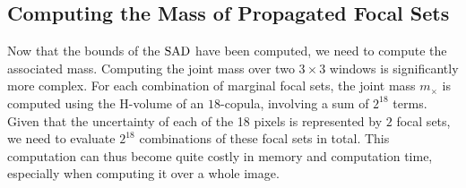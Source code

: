\begin{remark}
{}
\end{remark}

\subsection{Computing the Mass of Propagated Focal Sets}\label{sec:propagated_masses}
Now that the bounds of the $\mathrm{SAD}$ have been computed, we need to compute the associated mass. Computing the joint mass over two $3 \times 3$ windows is significantly more complex. For each combination of marginal focal sets, the joint mass $m_{\times}$ is computed using the H-volume of an $18$-copula, involving a sum of $2^{18}$ terms. Given that the uncertainty of each of the 18 pixels is represented by $2$ focal sets, we need to evaluate $2^{18}$ combinations of these focal sets in total. This computation can thus become quite costly in memory and computation time, especially when computing it over a whole image.

